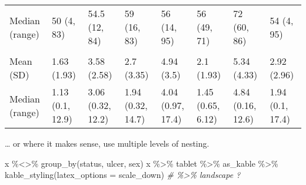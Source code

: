 \documentclass[
]{article}
\newenvironment{Shaded}{\begin{snugshade}}{\end{snugshade}}
\newcommand{\AttributeTok}[1]{\textcolor[rgb]{0.77,0.63,0.00}{#1}}
\newcommand{\CommentTok}[1]{\textcolor[rgb]{0.56,0.35,0.01}{\textit{#1}}}
\newcommand{\FunctionTok}[1]{\textcolor[rgb]{0.00,0.00,0.00}{#1}}
\newcommand{\NormalTok}[1]{#1}
\newcommand{\SpecialCharTok}[1]{\textcolor[rgb]{0.00,0.00,0.00}{#1}}
\newcommand{\StringTok}[1]{\textcolor[rgb]{0.31,0.60,0.02}{#1}}
\begin{document}
\begin{table}
{\begin{tabular}[t]{llllllll}
\hspace{1em}Median (range) & 50 (4, 83) & 54.5 (12, 84) & 59 (16, 83) & 56 (14, 95) & 56 (49, 71) & 72 (60, 86) & 54 (4, 95)\\
\addlinespace[0.3em]
\multicolumn{8}{l}{\textbf{Tumor Thickness (mm)}}\\
\hspace{1em}Mean (SD) & 1.63 (1.93) & 3.58 (2.58) & 2.7 (3.35) & 4.94 (3.5) & 2.1 (1.93) & 5.34 (4.33) & 2.92 (2.96)\\
\hspace{1em}Median (range) & 1.13 (0.1, 12.9) & 3.06 (0.32, 12.2) & 1.94 (0.32, 14.7) & 4.04 (0.97, 17.4) & 1.45 (0.65, 6.12) & 4.84 (0.16, 12.6) & 1.94 (0.1, 17.4)\\
\bottomrule
\end{tabular}}
\end{table}

\ldots{} or where it makes sense, use multiple levels of nesting.

\begin{Shaded}
\begin{Highlighting}[]
\NormalTok{x }\SpecialCharTok{\%\textless{}\textgreater{}\%} \FunctionTok{group\_by}\NormalTok{(status, ulcer, sex)}
\NormalTok{x }\SpecialCharTok{\%\textgreater{}\%} 
\NormalTok{  tablet }\SpecialCharTok{\%\textgreater{}\%} 
\NormalTok{  as\_kable }\SpecialCharTok{\%\textgreater{}\%} 
  \FunctionTok{kable\_styling}\NormalTok{(}\AttributeTok{latex\_options =} \StringTok{\textquotesingle{}scale\_down\textquotesingle{}}\NormalTok{) }\CommentTok{\# \%\textgreater{}\% landscape ?}
\end{Highlighting}
\end{Shaded}
\end{document}
